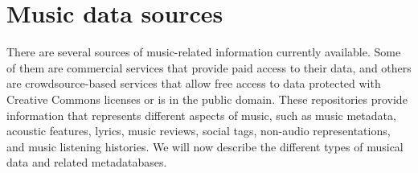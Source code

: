 







\section{Music data sources}\label{sub:music-data-sources}
There are several sources of music-related information currently available. Some of them are commercial services that provide paid access to their data, and others are crowdsource-based services that allow free access to data protected with Creative Commons licenses or is in the public domain.
These repositories provide information that represents different aspects of music, such as music metadata, acoustic features, lyrics, music reviews, social tags, non-audio representations, and music listening histories.
We will now describe the different types of musical data and related metadatabases.

